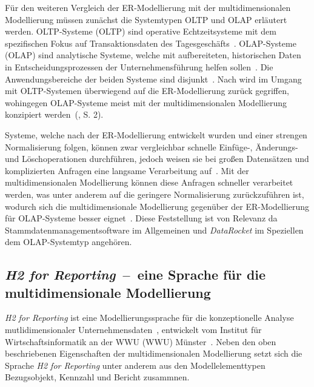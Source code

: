 \documentclass[
  language=german, %
  type=bachelor,%
  ngerman
]{isthesis}
\begin{document}
\begin{content}
	Für den weiteren Vergleich der \acrshort{ER}-Modellierung mit der
	multidimensionalen Modellierung müssen zunächst die Systemtypen
	\acrshort{OLTP} und \acrshort{OLAP} erläutert werden.  \acrlong{OLTP}-Systeme
	(\acrshort{OLTP}) sind operative Echtzeitsysteme mit dem spezifischen Fokus
	auf Transaktionsdaten des Tagesgeschäfts~\cite[][S.  11]{gabriel2009data}.
	\acrlong{OLAP}-Systeme (\acrshort{OLAP}) sind analytische Systeme, welche mit
	aufbereiteten, historischen Daten in Entscheidungsprozessen der
	Unternehmensführung helfen sollen~\cite[][S. 1]{chaudhuri1997overview}. Die
	Anwendungsbereiche der beiden Systeme sind disjunkt~\cite[][S.
	334]{chamoni2000line}. Nach \textsc{\citeauthor{phipps2002automating}} wird
	im Umgang mit \acrshort{OLTP}-Systemen überwiegend auf die ER-Modellierung
	zurück gegriffen, wohingegen \acrshort{OLAP}-Systeme meist mit der
	multidimensionalen Modellierung konzipiert
	werden~(\citeyear{phipps2002automating}, S. 2). 

	Systeme, welche nach der ER-Modellierung entwickelt wurden und einer strengen
	Normalisierung folgen, können zwar vergleichbar schnelle Einfüge-, Änderungs-
	und Löschoperationen durchführen, jedoch weisen sie bei großen Datensätzen
	und komplizierten Anfragen eine langsame Verarbeitung auf~\cite[][S.
	52]{ballard2012dimensional}. Mit der multidimensionalen Modellierung können
	diese Anfragen schneller verarbeitet werden, was unter anderem auf die
	geringere Normalisierung zurückzuführen ist, wodurch sich die
	multidimensionale Modellierung gegenüber der ER-Modellierung für
	\acrshort{OLAP}-Systeme besser eignet~\cite[][S.
	52]{ballard2012dimensional}. Diese Feststellung ist von Relevanz da
	Stammdatenmanagementsoftware im Allgemeinen und \textit{DataRocket} im
	Speziellen dem \acrlong{OLAP}-Systemtyp angehören.


  \subsection{\textit{H2 for Reporting}~--~eine Sprache für die multidimensionale Modellierung}

  \textit{H2 for Reporting} ist eine Modellierungssprache für die
  konzeptionelle Analyse mutlidimensionaler Unternehmensdaten~\cite[][S. 5, S.
  23]{becker2007h2}, entwickelt vom Institut für Wirtschaftsinformatik an der
  \acrlong{WWU} (\acrshort{WWU}) Münster~\cite[][S. 59 -
  78]{janiesch2007contextual}. Neben den oben beschriebenen Eigenschaften der
  multidimensionalen Modellierung setzt sich die Sprache \textit{H2 for
  Reporting} unter anderem aus den Modellelementtypen Bezugsobjekt, Kennzahl
  und Bericht zusammnen. 


\end{content}
\end{document}
